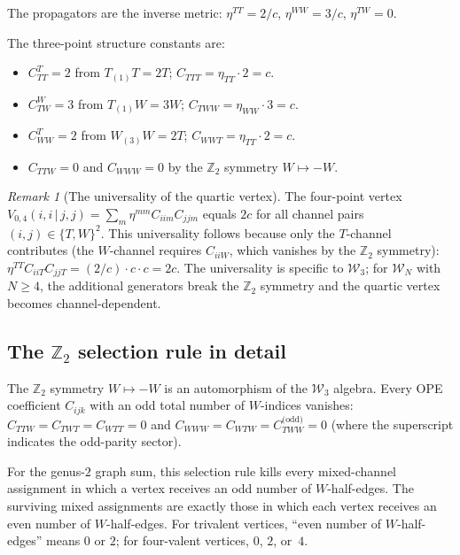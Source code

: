 \documentclass[11pt,reqno]{amsart}
\theoremstyle{definition}
\theoremstyle{remark}
\newtheorem{remark}[theorem]{Remark}
\newcommand{\cW}{\mathcal{W}}
\numberwithin{equation}{section}
\begin{document}
The propagators are the inverse metric:
$\eta^{TT} = 2/c$, $\eta^{WW} = 3/c$,
$\eta^{TW} = 0$.

The three-point structure constants are:
\begin{itemize}
\item $C^T_{TT} = 2$ from $T_{(1)}T = 2T$;
 $C_{TTT} = \eta_{TT} \cdot 2 = c$.
\item $C^W_{TW} = 3$ from $T_{(1)}W = 3W$;
 $C_{TWW} = \eta_{WW} \cdot 3 = c$.
\item $C^T_{WW} = 2$ from $W_{(3)}W = 2T$;
 $C_{WWT} = \eta_{TT} \cdot 2 = c$.
\item $C_{TTW} = 0$ and $C_{WWW} = 0$ by the
 $\mathbb{Z}_2$ symmetry $W \mapsto -W$.
\end{itemize}

\begin{remark}[The universality of the quartic
vertex]\label{rem:quartic-universality}
The four-point vertex
$V_{0,4}(i,i\,|\,j,j) = \sum_m \eta^{mm} C_{iim} C_{jjm}$
equals $2c$ for all channel pairs $(i,j) \in \{T,W\}^2$.
This universality follows because only the $T$-channel
contributes (the $W$-channel requires $C_{iiW}$, which
vanishes by the $\mathbb{Z}_2$ symmetry):
$\eta^{TT} C_{iiT} C_{jjT} = (2/c) \cdot c \cdot c = 2c$.
The universality is specific to $\cW_3$; for $\cW_N$ with
$N \ge 4$, the additional generators break the
$\mathbb{Z}_2$ symmetry and the quartic vertex becomes
channel-dependent.
\end{remark}

\subsection{The $\mathbb{Z}_2$ selection rule in
detail}\label{subsec:z2-detail}

The $\mathbb{Z}_2$ symmetry $W \mapsto -W$ is an
automorphism of the $\cW_3$ algebra. Every OPE coefficient
$C_{ijk}$ with an odd total number of $W$-indices vanishes:
$C_{TTW} = C_{TWT} = C_{WTT} = 0$ and
$C_{WWW} = C_{WTW} = C_{TWW}^{\text{(odd)}} = 0$
(where the superscript indicates the odd-parity sector).

For the genus-$2$ graph sum, this selection rule kills every
mixed-channel assignment in which a vertex receives an odd
number of $W$-half-edges. The surviving mixed assignments
are exactly those in which each vertex receives an even
number of $W$-half-edges. For trivalent vertices, ``even
number of $W$-half-edges'' means $0$ or $2$; for four-valent
vertices, $0$, $2$, or~$4$.
\end{document}
